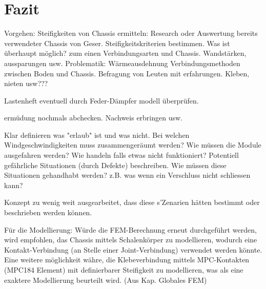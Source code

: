 
\section{Fazit}
\label{Fazit}

Vorgehen:
Steifigkeiten von Chassis ermitteln: Research oder Auswertung bereits verwendeter Chassis von Geser.
Steifigkeitskriterien bestimmen.
Was ist überhaupt möglich? zum einen Verbindungsarten und Chassis. Wandstärken, aussparungen usw.
Problematik: Wärmeausdehnung
Verbindungsmethoden zwischen Boden und Chassis. Befragung von Leuten mit erfahrungen. Kleben, nieten usw???

Lastenheft eventuell durch Feder-Dämpfer modell überprüfen.

ermüdung nochmals abchecken. Nachweis erbringen usw.

Klar definieren was "erlaub" ist und was nicht. Bei welchen Windgeschwindigkeiten muss zusammengeräumt werden? Wie müssen die Module ausgefahren werden? Wie handeln falls etwas nicht funktioniert? Potentiell gefährliche Situationen (durch Defekte) beschreiben. Wie müssen diese Situationen gehandhabt werden? z.B. was wenn ein Verschluss nicht schliessen kann?

Konzept zu wenig weit ausgearbeitet, dass diese s'Zenarien hätten bestimmt oder beschrieben werden können.


Für die Modellierung: Würde die FEM-Berechnung erneut durchgeführt werden, wird empfohlen, das Chassis mittels Schalenkörper zu modellieren, wodurch eine Kontakt-Verbindung (an Stelle einer Joint-Verbindung) verwendet werden könnte. Eine weitere möglichkeit währe, die Klebeverbindung mittels MPC-Kontakten (MPC184 Element) mit definierbarer Steifigkeit zu modellieren, was als eine exaktere Modellierung beurteilt wird.  (Aus Kap. Globales FEM)

